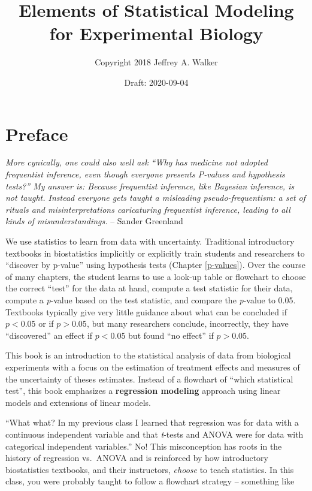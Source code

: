 \documentclass[]{book}
\title{Elements of Statistical Modeling for Experimental Biology}
\author{Copyright 2018 Jeffrey A. Walker}
\date{Draft: 2020-09-04}
\begin{document}
\maketitle

{
\setcounter{tocdepth}{1}
\tableofcontents
}
\hypertarget{preface}{%
\chapter*{Preface}\label{preface}}

\emph{More cynically, one could also well ask ``Why has medicine not adopted frequentist inference, even though everyone presents P-values and hypothesis tests?'' My answer is: Because frequentist inference, like Bayesian inference, is not taught. Instead everyone gets taught a misleading pseudo-frequentism: a set of rituals and misinterpretations caricaturing frequentist inference, leading to all kinds of misunderstandings.} -- Sander Greenland

We use statistics to learn from data with uncertainty. Traditional introductory textbooks in biostatistics implicitly or explicitly train students and researchers to ``discover by p-value'' using hypothesis tests (Chapter \ref{p-values}). Over the course of many chapters, the student learns to use a look-up table or flowchart to choose the correct ``test'' for the data at hand, compute a test statistic for their data, compute a \emph{p}-value based on the test statistic, and compare the \emph{p}-value to 0.05. Textbooks typically give very little guidance about what can be concluded if \(p < 0.05\) or if \(p > 0.05\), but many researchers conclude, incorrectly, they have ``discovered'' an effect if \(p < 0.05\) but found ``no effect'' if \(p > 0.05\).

This book is an introduction to the statistical analysis of data from biological experiments with a focus on the estimation of treatment effects and measures of the uncertainty of theses estimates. Instead of a flowchart of ``which statistical test'', this book emphasizes a \textbf{regression modeling} approach using linear models and extensions of linear models.

``What what? In my previous class I learned that regression was for data with a continuous independent variable and that \emph{t}-tests and ANOVA were for data with categorical independent variables.'' No! This misconception has roots in the history of regression vs.~ANOVA and is reinforced by how introductory biostatistics textbooks, and their instructors, \emph{choose} to teach statistics. In this class, you were probably taught to follow a flowchart strategy -- something like
\end{document}
